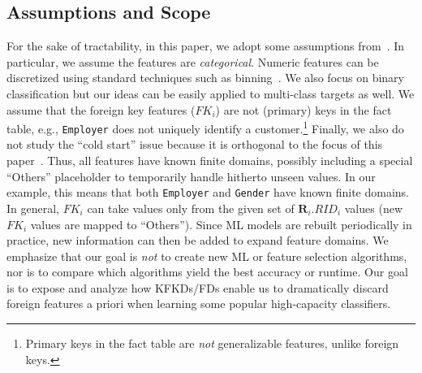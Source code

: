 \documentclass{vldb}
\newcommand{\eat}[1]{}
\begin{document}
\eat{
\paragraph*{Example}
Consider a common classification task for which ML classifiers are used, predicting \textit{customer churn}.
The fact table is \texttt{Customers} (\underline{\texttt{CustomerID}}, \texttt{Churn}, \texttt{Gender}, \texttt{Age}, \texttt{Employer}, \texttt{ZipCode}).
\texttt{Employer} and \texttt{Zipcode} are foreign key features that refer respectively to a customer's employer (e.g., Google or Microsoft) and the area 
where a customer lives. The respective dimension tables are \texttt{Employers} (\underline{\texttt{Employer}}, \texttt{State}, \texttt{Revenue}) 
and \texttt{Areas} (\underline{ZipCode}, \texttt{CrimeRate}, \texttt{AccidentRate}).
In such scenarios, data scientists typically join all base tables to bring in the extra features from the dimension tables. In this case, they might do so 
because of a hunch that customers employed by rich corporations in coastal states and living in ``safe'' areas are unlikely to churn.
}

\subsection{Assumptions and Scope}
For the sake of tractability, in this paper, we adopt some assumptions from~\cite{hamlet}. In particular, we assume the features are 
\textit{categorical}. Numeric features can be discretized using standard techniques such as binning~\cite{mitchellbook}. 
We also focus on binary classification but our ideas can be easily applied to multi-class targets as well. 
We assume that the foreign key features ($FK_i$) are not (primary) keys in the fact table, e.g., \texttt{Employer} does 
not uniquely identify a customer.\footnote{Primary keys in the fact table are \textit{not} generalizable features, unlike foreign keys.}
Finally, we also do not study the ``cold start'' issue because it is orthogonal to the focus of this paper~\cite{coldstart}. Thus, all features 
have known finite domains, possibly including a special ``Others'' placeholder to temporarily handle hitherto unseen values. 
In our example, this means that both \texttt{Employer} and \texttt{Gender} have known finite domains.
In general, $FK_i$ can take values only from the given set of $\textbf{R}_i.RID_i$ values (new $FK_i$ values 
are mapped to ``Others''). Since ML models are rebuilt periodically in practice, new information can then be added to expand feature domains. 
We emphasize that our goal is \textit{not} to create new ML or feature selection algorithms, nor is to compare which algorithms yield 
the best accuracy or runtime. Our goal is to expose and analyze how KFKDs/FDs enable us to dramatically discard foreign features a priori 
when learning some popular high-capacity classifiers.
\end{document}
